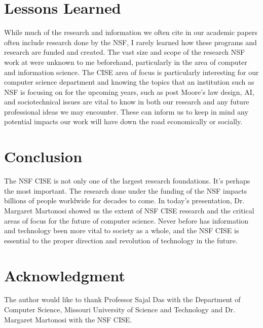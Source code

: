 \documentclass[journal,onecolumn]{IEEEtran}
\begin{document}
\section{Lessons Learned}

While much of the research and information we often cite in our academic papers often include research done by the NSF, I rarely learned how these programs and research are funded and created. The vast size and scope of the research NSF work at were unknown to me beforehand, particularly in the area of computer and information science. The CISE area of focus is particularly interesting for our computer science department and knowing the topics that an institution such as NSF is focusing on for the upcoming years, such as post Moore's law design, AI, and sociotechnical issues are vital to know in both our research and any future professional ideas we may encounter. These can inform us to keep in mind any potential impacts our work will have down the road economically or socially. 

\section{Conclusion}

The NSF CISE is not only one of the largest research foundations. It's perhaps the most important. The research done under the funding of the NSF impacts billions of people worldwide for decades to come. In today's presentation, Dr. Margaret Martonosi showed us the extent of NSF CISE research and the critical areas of focus for the future of computer science. Never before has information and technology been more vital to society as a whole, and the NSF CISE is essential to the proper direction and revolution of technology in the future. 




\section*{Acknowledgment}
The author would like to thank Professor Sajal Das with the Department of Computer Science, Missouri University of Science and Technology and Dr. Margaret Martonosi with the NSF CISE.
\end{document}
